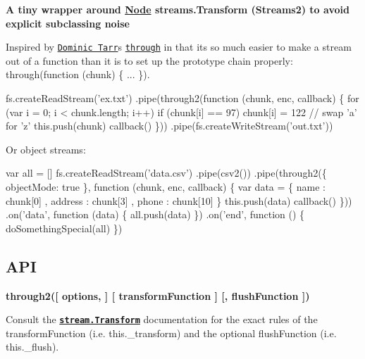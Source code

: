 \href{http://travis-ci.org/rvagg/through2}{\tt }

\href{https://nodei.co/npm/through2/}{\tt }

\href{https://david-dm.org/rvagg/through2/}{\tt } \href{https://david-dm.org/rvagg/through2#info=devDependencies/}{\tt }

{\bfseries A tiny wrapper around \mbox{\hyperlink{classNode}{Node}} streams.\+Transform (Streams2) to avoid explicit subclassing noise}

Inspired by \href{https://github.com/dominictarr}{\tt Dominic Tarr}\textquotesingle{}s \href{https://github.com/dominictarr/through}{\tt through} in that it\textquotesingle{}s so much easier to make a stream out of a function than it is to set up the prototype chain properly\+: {\ttfamily through(function (chunk) \{ ... \})}.


\begin{DoxyCode}
fs.createReadStream('ex.txt')
    .pipe(through2(function (chunk, enc, callback) \{
    for (var i = 0; i < chunk.length; i++)
      if (chunk[i] == 97)
        chunk[i] = 122 // swap 'a' for 'z'
    this.push(chunk)
    callback()
  \}))
  .pipe(fs.createWriteStream('out.txt'))
\end{DoxyCode}


Or object streams\+:


\begin{DoxyCode}
var all = []
fs.createReadStream('data.csv')
  .pipe(csv2())
  .pipe(through2(\{ objectMode: true \}, function (chunk, enc, callback) \{
    var data = \{
        name    : chunk[0]
      , address : chunk[3]
      , phone   : chunk[10]
    \}
    this.push(data)
    callback()
  \}))
  .on('data', function (data) \{
    all.push(data)
  \})
  .on('end', function () \{
    doSomethingSpecial(all)
  \})
\end{DoxyCode}


\subsection*{A\+PI}

{\bfseries {\ttfamily through2(\mbox{[} options, \mbox{]} \mbox{[} transform\+Function \mbox{]} \mbox{[}, flush\+Function \mbox{]})}}

Consult the {\bfseries \href{http://nodejs.org/docs/latest/api/stream.html#stream_class_stream_transform}{\tt stream.\+Transform}} documentation for the exact rules of the {\ttfamily transform\+Function} (i.\+e. {\ttfamily this.\+\_\+transform}) and the optional {\ttfamily flush\+Function} (i.\+e. {\ttfamily this.\+\_\+flush}).

